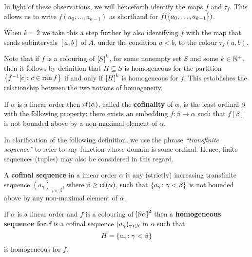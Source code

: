 \begin{conv}[Colourings]\label{rem:Col}
	In light of these observations, we will henceforth identify the maps $f$ and
	$\tau_f$.  This allows us to write $f(a_0,\dotsc,a_{k-1})$ as
	shorthand for $f(\set{a_0,\dotsc,a_{k-1}})$.

	When $k=2$ we take this a step further by also identifying $f$ with the map
	that sends subintervals $[a,b]$ of $A$, under the condition $a<b$, to the
	colour $\tau_f(a,b)$.
\end{conv}

\begin{rem}[Homogeneity]\label{rem:hom}
	Note that if $f$ is a colouring of $\subsets{k}{S}$, for some nonempty set
	$S$ and some $k\in\posnats$, then it follows by definition that $H\subseteq
		S$ is homogeneous for the partition $\setbuild{f^{-1}[c]}{c\in\range f}$ if
	and only if $\subsets{k}{H}$ is homogeneous for $f$.  This establishes the
	relationship between the two notions of homogeneity.
\end{rem}


\begin{dfn}[Cofinality]
	If $\alpha$ is a linear order then $\cf(\alpha)$, called the
	\textbf{cofinality} of $\alpha$, is the least ordinal $\beta$ with the
	following property: there exists an embedding $f\colon\beta\to\alpha$ such
	that $f[\beta]$ is not bounded above by a non-maximal element of $\alpha$.
\end{dfn}

In clarification of the following definition, we use the phrase
\textit{``transfinite sequence''} to refer to any function whose domain is some
ordinal.  Hence, finite sequences (tuples) may also be considered in this
regard.

\begin{dfn}
	A \textbf{cofinal sequence} in a linear order $\alpha$ is any (strictly)
	increasing transfinite sequence $(a_\gamma)_{\gamma<\beta}$, where
	$\beta\geq\cf(\alpha)$, such that $\setbuild{a_\gamma}{\gamma<\beta}$ is
	not bounded above by any non-maximal element of $\alpha$.
\end{dfn}

\begin{dfn}
	If $\alpha$ is a linear order and $f$ is a colouring of
	$\subsets{2}{\domain\alpha}$ then a \textbf{homogeneous sequence for
		$\bm{f}$} is a cofinal sequence $\family{a_\gamma}{\gamma<\beta}$ in
	$\alpha$ such that
	\begin{equation}
		H=\setbuild{a_\gamma}{\gamma<\beta}
	\end{equation}
	is homogeneous for $f$.
\end{dfn}

